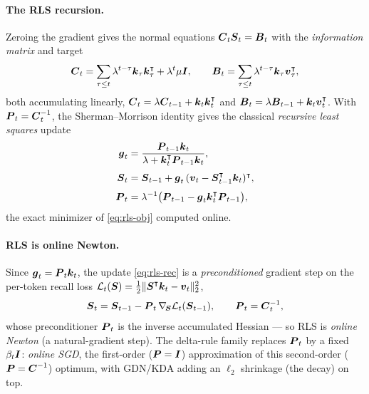 \documentclass[11pt,letterpaper,logo]{yalearxiv}
\begin{document}
\paragraph{The RLS recursion.}
Zeroing the gradient gives the normal equations $\boldsymbol{C}_t \boldsymbol{S}_t = \boldsymbol{B}_t$ with the \emph{information
matrix} and target
\begin{equation}
  \boldsymbol{C}_t = \sum_{\tau\le t}\lambda^{t-\tau}\boldsymbol{k}_\tau \boldsymbol{k}_\tau^{\intercal}
  + \lambda^{t}\mu \boldsymbol{I},
  \qquad
  \boldsymbol{B}_t = \sum_{\tau\le t}\lambda^{t-\tau}\boldsymbol{k}_\tau \boldsymbol{v}_\tau^{\intercal},
  \label{eq:rls-info}
\end{equation}
both accumulating linearly, $\boldsymbol{C}_t=\lambda \boldsymbol{C}_{t-1}+\boldsymbol{k}_t \boldsymbol{k}_t^{\intercal}$ and
$\boldsymbol{B}_t=\lambda \boldsymbol{B}_{t-1}+\boldsymbol{k}_t \boldsymbol{v}_t^{\intercal}$. With $\boldsymbol{P}_t=\boldsymbol{C}_t^{-1}$, the Sherman--Morrison identity gives
the classical \emph{recursive least squares} update
\begin{equation}
\begin{aligned}
  \boldsymbol{g}_t &= \frac{\boldsymbol{P}_{t-1}\boldsymbol{k}_t}
  {\lambda+\boldsymbol{k}_t^{\intercal}\boldsymbol{P}_{t-1}\boldsymbol{k}_t}, \\[3pt]
  \boldsymbol{S}_t &= \boldsymbol{S}_{t-1}+\boldsymbol{g}_t\,
  (\boldsymbol{v}_t-\boldsymbol{S}_{t-1}^{\intercal}\boldsymbol{k}_t)^{\intercal}, \\[3pt]
  \boldsymbol{P}_t &= \lambda^{-1}\big(\boldsymbol{P}_{t-1}-\boldsymbol{g}_t \boldsymbol{k}_t^{\intercal}\boldsymbol{P}_{t-1}\big),
\end{aligned}
\label{eq:rls-rec}
\end{equation}
the exact minimizer of \eqref{eq:rls-obj} computed online.

\paragraph{RLS is online Newton.}
Since $\boldsymbol{g}_t=\boldsymbol{P}_t \boldsymbol{k}_t$, the update \eqref{eq:rls-rec} is a \emph{preconditioned} gradient step on
the per-token recall loss $\mathcal L_t(\boldsymbol{S})=\tfrac12\|\boldsymbol{S}^{\intercal}\boldsymbol{k}_t-\boldsymbol{v}_t\|_2^2$,
\begin{equation}
  \boldsymbol{S}_t = \boldsymbol{S}_{t-1} - \boldsymbol{P}_t\,\nabla_{\!\boldsymbol{S}}\mathcal L_t(\boldsymbol{S}_{t-1}),
  \qquad \boldsymbol{P}_t = \boldsymbol{C}_t^{-1},
  \label{eq:rls-newton}
\end{equation}
whose preconditioner $\boldsymbol{P}_t$ is the inverse accumulated Hessian --- so RLS is \emph{online
Newton} (a natural-gradient step). The delta-rule family replaces $\boldsymbol{P}_t$ by a fixed
$\beta_t \boldsymbol{I}$: \emph{online SGD}, the first-order ($\boldsymbol{P}=\boldsymbol{I}$) approximation of this second-order
($\boldsymbol{P}=\boldsymbol{C}^{-1}$) optimum, with GDN/KDA adding an $\ell_2$ shrinkage (the decay) on top.
\end{document}
